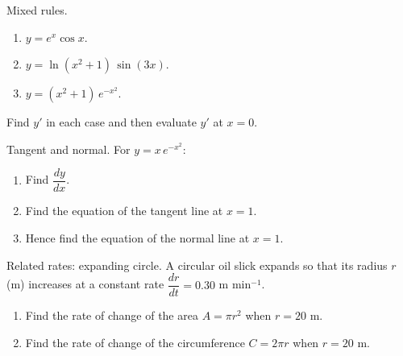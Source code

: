 \documentclass[11pt]{article}
\def\textbf#1{#1}%
\newcounter{question}
\begin{document}
\begin{question}
\textbf{Mixed rules.}
\begin{enumerate}
  \item $y=e^{x}\cos x$.
  \item $y=\ln(x^{2}+1)\,\sin(3x)$.
  \item $y=(x^{2}+1)\,e^{-x^{2}}$.
\end{enumerate}
Find $y'$ in each case and then evaluate $y'$ at $x=0$.
\end{question}

\begin{question}
\textbf{Tangent and normal.} For $y=x\,e^{-x^{2}}$:
\begin{enumerate}
  \item Find $\dfrac{dy}{dx}$.
  \item Find the equation of the tangent line at $x=1$.
  \item Hence find the equation of the normal line at $x=1$.
\end{enumerate}
\end{question}

\begin{question}
\textbf{Related rates: expanding circle.} A circular oil slick expands so that its radius $r$ (m) increases at a constant rate $\dfrac{dr}{dt}=0.30$ m min$^{-1}$. 
\begin{enumerate}
  \item Find the rate of change of the area $A=\pi r^{2}$ when $r=20$ m.
  \item Find the rate of change of the circumference $C=2\pi r$ when $r=20$ m.
\end{enumerate}

\begin{center}
\end{center}
\end{question}
\end{document}

